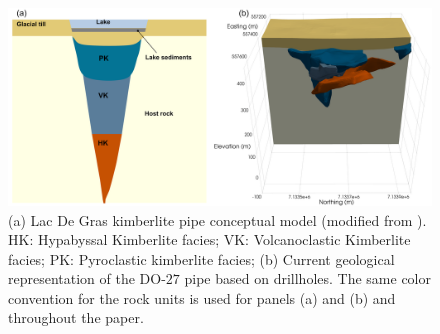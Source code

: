 \documentclass[paper, twocolumn]{geophysics} %
\begin{document}


\begin{figure}
\centering
\includegraphics[width=\textwidth]{Figures/300dpi/Figure2.png}
\caption{(a) Lac De Gras kimberlite pipe conceptual model (modified from \citet{TKCpaper}). HK: Hypabyssal Kimberlite facies; VK: Volcanoclastic Kimberlite facies; PK: Pyroclastic kimberlite facies; (b) Current geological representation of the DO-$27$ pipe based on drillholes. The same color convention for the rock units is used for panels (a) and (b) and throughout the paper.}
\label{fig:Figure2.png}
\end{figure}

\end{document}
